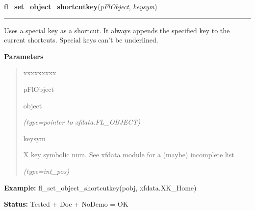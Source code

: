 \hspace{.8\funcindent}\begin{boxedminipage}{\funcwidth}

    \raggedright \textbf{fl\_set\_object\_shortcutkey}(\textit{pFlObject}, \textit{keysym})

    \vspace{-1.5ex}

    \rule{\textwidth}{0.5\fboxrule}
\setlength{\parskip}{2ex}
    Uses a special key as a shortcut. It always appends the specified key 
    to the current shortcuts. Special keys can't be underlined.

\setlength{\parskip}{1ex}
      \textbf{Parameters}
      \vspace{-1ex}

      \begin{quote}
        \begin{Ventry}{xxxxxxxxx}

          \item[pFlObject]

          object

            {\it (type=pointer to xfdata.FL\_OBJECT)}

          \item[keysym]

          X key symbolic num. See xfdata module for a (maybe) incomplete 
          list

            {\it (type=int\_pos)}

        \end{Ventry}

      \end{quote}

\textbf{Example:} fl\_set\_object\_shortcutkey(pobj, xfdata.XK\_Home)



\textbf{Status:} Tested + Doc + NoDemo = OK



    \end{boxedminipage}

    \label{xformslib:flbasic:fl_set_object_dblbuffer}

    \vspace{0.5ex}

